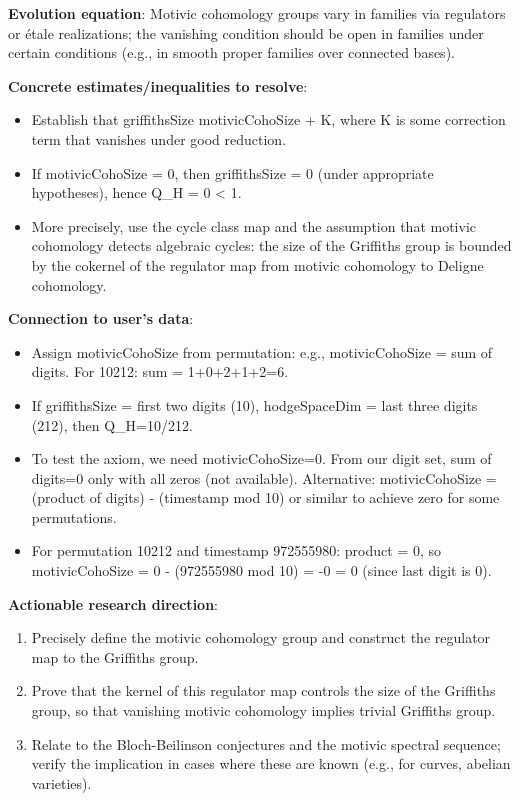 \documentclass[11pt]{article}
\begin{document}
\textbf{Evolution equation}: Motivic cohomology groups vary in families via regulators or étale realizations; the vanishing condition should be open in families under certain conditions (e.g., in smooth proper families over connected bases).

\textbf{Concrete estimates/inequalities to resolve}:
\begin{itemize}
\item Establish that griffithsSize \leq motivicCohoSize + K, where K is some correction term that vanishes under good reduction.
\item If motivicCohoSize = 0, then griffithsSize = 0 (under appropriate hypotheses), hence Q\_H = 0 < 1.
\item More precisely, use the cycle class map and the assumption that motivic cohomology detects algebraic cycles: the size of the Griffiths group is bounded by the cokernel of the regulator map from motivic cohomology to Deligne cohomology.
\end{itemize}

\textbf{Connection to user's data}:
\begin{itemize}
\item Assign motivicCohoSize from permutation: e.g., motivicCohoSize = sum of digits. For 10212: sum = 1+0+2+1+2=6.
\item If griffithsSize = first two digits (10), hodgeSpaceDim = last three digits (212), then Q\_H=10/212.
\item To test the axiom, we need motivicCohoSize=0. From our digit set, sum of digits=0 only with all zeros (not available). Alternative: motivicCohoSize = (product of digits) - (timestamp mod 10) or similar to achieve zero for some permutations.
\item For permutation 10212 and timestamp 972555980: product = 0, so motivicCohoSize = 0 - (972555980 mod 10) = -0 = 0 (since last digit is 0).
\end{itemize}

\textbf{Actionable research direction}:
\begin{enumerate}
\item Precisely define the motivic cohomology group and construct the regulator map to the Griffiths group.
\item Prove that the kernel of this regulator map controls the size of the Griffiths group, so that vanishing motivic cohomology implies trivial Griffiths group.
\item Relate to the Bloch-Beilinson conjectures and the motivic spectral sequence; verify the implication in cases where these are known (e.g., for curves, abelian varieties).
\end{enumerate}
\end{document}
